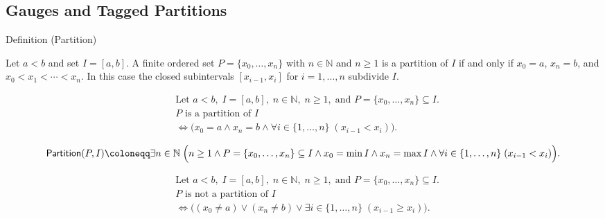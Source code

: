 
\subsection*{Gauges and Tagged Partitions}
\label{sec:gauges-tagged-partitions}

\begin{definitionbox}{Definition (Partition)}
\begin{definition}[Partition]
\label{def:interval-partition}
Let $a<b$ and set $I=[a,b]$. A finite ordered set $P=\{x_0,\ldots,x_n\}$ with $n\in\mathbb{N}$ and $n\ge 1$ is a partition of $I$ if and only if $x_0=a$, $x_n=b$, and $x_0<x_1<\cdots<x_n$. In this case the closed subintervals $[x_{i-1},x_i]$ for $i=1,\ldots,n$ subdivide $I$.
\end{definition}
\end{definitionbox}

\begin{remark*}
\[
\begin{aligned}
&\text{Let } a<b,\; I=[a,b],\; n\in\mathbb{N},\; n\ge 1,\; \text{and } P=\{x_0,\ldots,x_n\}\subseteq I.\\
&P \text{ is a partition of } I\\
&\Longleftrightarrow \bigl(x_0=a \land x_n=b \land \forall i\in\{1,\ldots,n\}\;(x_{i-1}<x_i)\bigr).
\end{aligned}
\]
\end{remark*}

\begin{remark*}
\[
\mathsf{Partition}(P,I) \coloneqq
\exists n\in\mathbb{N}\;\Bigl(n\ge 1 \land P=\{x_0,\ldots,x_n\}\subseteq I
\land x_0=\min I \land x_n=\max I
\land \forall i\in\{1,\ldots,n\}\;(x_{i-1}<x_i)\Bigr).
\]
\end{remark*}

\begin{remark*}
\[
\begin{aligned}
&\text{Let } a<b,\; I=[a,b],\; n\in\mathbb{N},\; n\ge 1,\; \text{and } P=\{x_0,\ldots,x_n\}\subseteq I.\\
&P \text{ is not a partition of } I\\
&\Longleftrightarrow \bigl((x_0\ne a) \lor (x_n\ne b) \lor \exists i\in\{1,\ldots,n\}\;(x_{i-1}\ge x_i)\bigr).
\end{aligned}
\]
\end{remark*}

